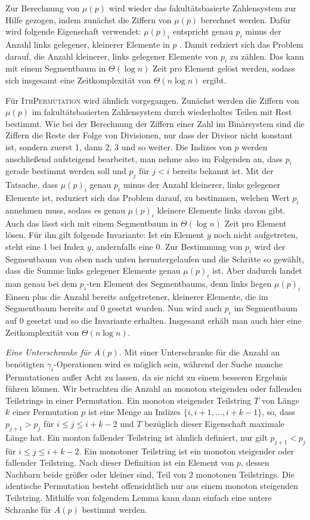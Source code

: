 \documentclass[a4paper, 11pt, ngerman]{article}
\begin{document}
Zur Berechnung von $\mu(p)$ wird wieder das fakultätsbasierte Zahlensystem zur Hilfe gezogen, indem zunächst die Ziffern von $\mu(p)$ berechnet werden. Dafür wird folgende Eigenschaft verwendet: $\mu(p)_i$ entspricht genau $p_i$ minus der Anzahl links gelegener, kleinerer Elemente in $p$ \cite{permutationranking}. Damit redziert sich das Problem darauf, die Anzahl kleinerer, links gelegener Elemente von $p_i$ zu zählen. Das kann mit einem Segmentbaum in $\Theta(\log n)$ Zeit pro Element gelöst werden, sodass sich insgesamt eine Zeitkomplexität von $\Theta(n \log n)$ ergibt.

Für \textsc{IthPermutation} wird ähnlich vorgegangen. Zunächst werden die Ziffern von $\mu(p)$ im fakultätsbasierten Zahlensystem durch wiederholtes Teilen mit Rest bestimmt. Wie bei der Berechnung der Ziffern einer Zahl im Binärsystem sind die Ziffern die Reste der Folge von Divisionen, nur dass der Divisor nicht konstant ist, sondern zuerst 1, dann 2, 3 und so weiter. Die Indizes von $p$ werden anschließend aufsteigend bearbeitet, man nehme also im Folgenden an, dass $p_i$ gerade bestimmt werden soll und $p_j$ für $j < i$ bereits bekannt ist. Mit der Tatsache, dass $\mu(p)_i$ genau $p_i$ minus der Anzahl kleinerer, links gelegener Elemente ist, reduziert sich das Problem darauf, zu bestimmen, welchen Wert $p_i$ annehmen muss, sodass es genau $\mu(p)_i$ kleinere Elemente links davon gibt. Auch das lässt sich mit einem Segmentbaum in $\Theta(\log n)$ Zeit pro Element lösen. Für ihn gilt folgende Invariante: Ist ein Element $y$ noch nicht aufgetreten, steht eine 1 bei Index $y$, andernfalls eine 0. Zur Bestimmung von $p_i$ wird der Segmentbaum von oben nach unten heruntergelaufen und die Schritte so gewählt, dass die Summe links gelegener Elemente genau $\mu(p)_i$ ist. Aber dadurch landet man genau bei dem $p_i$-ten Element des Segmentbaums, denn links liegen $\mu(p)_i$ Einsen plus die Anzahl bereits aufgetretener, kleinerer Elemente, die im Segmentbaum bereits auf 0 gesetzt wurden. Nun wird auch $p_i$ im Segmentbaum auf 0 gesetzt und so die Invariante erhalten. Insgesamt erhält man auch hier eine Zeitkomplexität von $\Theta(n \log n)$.
\bigskip

\noindent \emph{Eine Unterschranke für $A(p)$.} Mit einer Unterschranke für die Anzahl an benötigten $\gamma_i$-Operationen wird es möglich sein, während der Suche manche Permutationen außer Acht zu lassen, da sie nicht zu einem besseren Ergebnis führen können. Wir betrachten die Anzahl an monoton steigenden oder fallenden Teilstrings in einer Permutation. Ein monoton steigender Teilstring $T$ von Länge $k$ einer Permutation $p$ ist eine Menge an Indizes $\{i, i + 1, \dots, i + k - 1\}$, so, dass $p_{j+1} > p_j$ für $i \le j \le i+ k - 2$ und $T$ bezüglich dieser Eigenschaft maximale Länge hat. Ein monton fallender Teilstring ist ähnlich definiert, nur gilt $p_{j + 1} < p_j$ für $i \le j \le i + k - 2$. Ein monotoner Teilstring ist ein monoton steigender oder fallender Teilstring. Nach dieser Definition ist ein Element von $p$, dessen Nachbarn beide größer oder kleiner sind, Teil von 2 monotonen Teilstrings. Die identische Permutation besteht offensichtlich nur aus einem monoton steigenden Teilstring. Mithilfe von folgendem Lemma kann dann einfach eine untere Schranke für $A(p)$ bestimmt werden.
\end{document}
